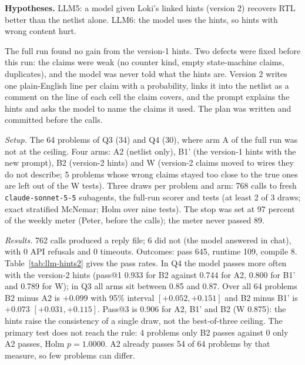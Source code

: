 \documentclass[conference]{IEEEtran}
\newcommand{\hev}[1]{\par\smallskip\noindent\textbf{#1}}
\newcommand{\code}[1]{\texttt{#1}}
\begin{document}
\hev{Hypotheses.} LLM5: a model given Loki's linked hints (version 2) recovers RTL better than the netlist alone.
LLM6: the model uses the hints, so hints with wrong content hurt.


The full run found no gain from the version-1 hints. Two defects were fixed before this run: the claims were weak
(no counter kind, empty state-machine claims, duplicates), and the model was never told what the hints are. Version 2
writes one plain-English line per claim with a probability, links it into the netlist as a comment on the line of each
cell the claim covers, and the prompt explains the hints and asks the model to name the claims it used. The plan was
written and committed before the calls.

\emph{Setup.} The 64 problems of Q3 (34) and Q4 (30), where arm A of the full run was not at the ceiling. Four arms:
A2 (netlist only), B1' (the version-1 hints with the new prompt), B2 (version-2 hints) and W (version-2 claims moved to
wires they do not describe; 5 problems whose wrong claims stayed too close to the true ones are left out of the W tests).
Three draws per problem and arm: 768 calls to fresh \code{claude-sonnet-5-5} subagents, the full-run scorer and tests
(at least 2 of 3 draws; exact stratified McNemar; Holm over nine tests). The stop was set at 97 percent of the weekly
meter (Peter, before the calls); the meter never passed 89.

\emph{Results.} 762 calls produced a reply file; 6 did not (the model answered in chat), with 0 API refusals and 0 timeouts.
Outcomes: pass 645, runtime 109, compile 8. Table~\ref{tab:llm-hints2} gives the pass rates. In Q4 the model passes more
often with the version-2 hints (pass@1 0.933 for B2 against 0.744 for A2, 0.800 for B1' and 0.789 for W); in Q3 all arms sit
between 0.85 and 0.87. Over all 64 problems B2 minus A2 is $+0.099$ with 95\% interval $[+0.052,+0.151]$ and B2 minus B1'
is $+0.073$ $[+0.031,+0.115]$. Pass@3 is 0.906 for A2, B1' and B2 (W 0.875): the hints raise the consistency of a single
draw, not the best-of-three ceiling. The primary test does not reach the rule: 4 problems only B2 passes against 0 only
A2 passes, Holm $p=1.0000$. A2 already passes 54 of 64 problems by that measure, so few problems can differ.
\end{document}
